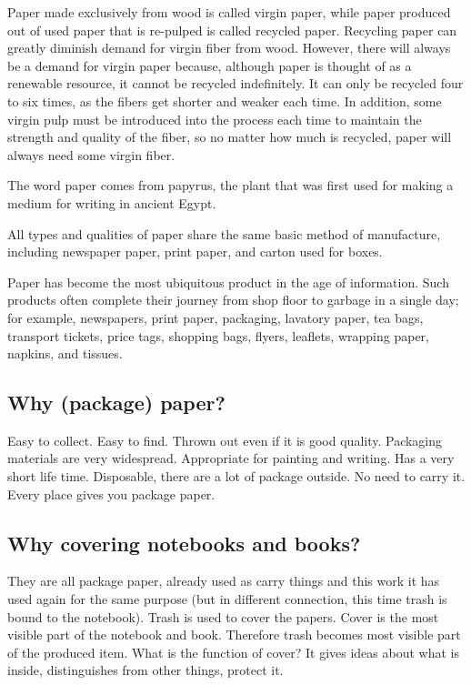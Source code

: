Paper made exclusively from wood is called virgin paper, while paper produced out of used paper that is re-pulped is called recycled paper. Recycling paper can greatly diminish demand for virgin fiber from wood. However, there will always be a demand for virgin paper because, although paper is thought of as a renewable resource, it cannot be recycled indefinitely. It can only be recycled four to six times, as the fibers get shorter and weaker each time. In addition, some virgin pulp must be introduced into the process each time to maintain the strength and quality of the fiber, so no matter how much is recycled, paper will always need some virgin fiber.

The word paper comes from papyrus, the plant that was first used for making a medium for writing in ancient Egypt.

All types and qualities of paper share the same basic method of manufacture, including newspaper paper, print paper, and carton used for boxes.

Paper has become the most ubiquitous product in the age of information. Such products often complete their journey from shop floor to garbage in a single day; for example, newspapers, print paper, packaging, lavatory paper, tea bags, transport tickets, price tags, shopping bags, flyers, leaflets, wrapping paper, napkins, and tissues. 

\subsection{Why (package) paper?}
Easy to collect. Easy to find. Thrown out even if it is good quality. Packaging materials are very widespread. Appropriate for painting and writing. Has a very short life time. Disposable, there are a lot of package outside. No need to carry it. Every place gives you package paper. 

\subsection{Why covering notebooks and books?}
They are all package paper, already used as carry things and this work it has used again for the same purpose (but in different connection, this time trash is bound to the notebook). Trash is used to cover the papers. Cover is the most visible part of the notebook and book. Therefore trash becomes most visible part of the produced item. What is the function of cover? It gives ideas about what is inside, distinguishes from other things, protect it.

